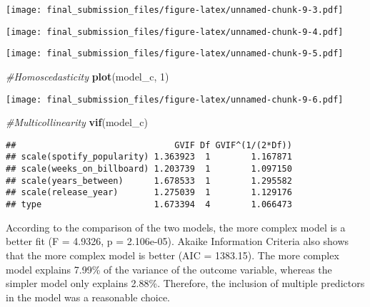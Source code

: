 \documentclass[
]{article}
\newenvironment{Shaded}{\begin{snugshade}}{\end{snugshade}}
\newcommand{\CommentTok}[1]{\textcolor[rgb]{0.56,0.35,0.01}{\textit{#1}}}
\newcommand{\DecValTok}[1]{\textcolor[rgb]{0.00,0.00,0.81}{#1}}
\newcommand{\FunctionTok}[1]{\textcolor[rgb]{0.13,0.29,0.53}{\textbf{#1}}}
\newcommand{\NormalTok}[1]{#1}
\newcommand{\SpecialCharTok}[1]{\textcolor[rgb]{0.81,0.36,0.00}{\textbf{#1}}}
\begin{document}
\texttt{[image: final\_submission\_files/figure-latex/unnamed-chunk-9-3.pdf]}

\begin{Shaded}
\end{Shaded}

\texttt{[image: final\_submission\_files/figure-latex/unnamed-chunk-9-4.pdf]}

\begin{Shaded}
\end{Shaded}

\texttt{[image: final\_submission\_files/figure-latex/unnamed-chunk-9-5.pdf]}

\begin{Shaded}
\begin{Highlighting}[]
\CommentTok{\#Homoscedasticity}
\FunctionTok{plot}\NormalTok{(model\_c, }\DecValTok{1}\NormalTok{)}
\end{Highlighting}
\end{Shaded}

\texttt{[image: final\_submission\_files/figure-latex/unnamed-chunk-9-6.pdf]}

\begin{Shaded}
\begin{Highlighting}[]
\CommentTok{\#Multicollinearity}
\FunctionTok{vif}\NormalTok{(model\_c)}
\end{Highlighting}
\end{Shaded}

\begin{verbatim}
##                               GVIF Df GVIF^(1/(2*Df))
## scale(spotify_popularity) 1.363923  1        1.167871
## scale(weeks_on_billboard) 1.203739  1        1.097150
## scale(years_between)      1.678533  1        1.295582
## scale(release_year)       1.275039  1        1.129176
## type                      1.673394  4        1.066473
\end{verbatim}

According to the comparison of the two models, the more complex model is
a better fit (F = 4.9326, p = 2.106e-05). Akaike Information Criteria
also shows that the more complex model is better (AIC = 1383.15). The
more complex model explains 7.99\% of the variance of the outcome
variable, whereas the simpler model only explains 2.88\%. Therefore, the
inclusion of multiple predictors in the model was a reasonable choice.
\end{document}
